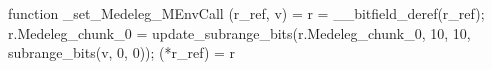 function _set_Medeleg_MEnvCall (r_ref, v) = {
    r = __bitfield_deref(r_ref);
    r.Medeleg_chunk_0 = update_subrange_bits(r.Medeleg_chunk_0, 10, 10, subrange_bits(v, 0, 0));
    (*r_ref) = r
}
